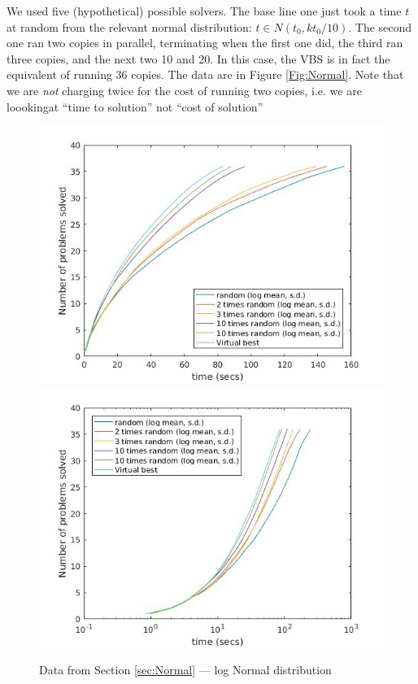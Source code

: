 \documentclass{easychair}
\begin{document}
We used five (hypothetical) possible solvers. The base line one just took a time $t$ at random from the relevant normal distribution: $t \in N(t_0,kt_0/10)$. The second one ran two copies in parallel, terminating when the first one did, the third ran three copies, and the next two 10 and 20. In this case, the VBS is in fact the equivalent of running 36 copies.
The data are in Figure  \ref{Fig:Normal}. Note that we are \emph{not} charging twice for the cost of running two copies, i.e. we are loookingat ``time to solution'' not ``cost of solution''
\begin{figure}[h]
\caption{Data from Section \ref{sec:Normal} --- log Normal distribution\label{Fig:Normallog}}
\includegraphics[scale=0.4]{RSolvelog20.jpg}
\includegraphics[scale=0.4]{RlogSolvelog20.jpg}
\end{figure}
\end{document}
